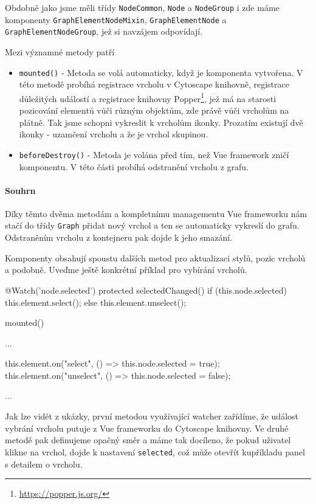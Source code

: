 Obdobně jako jsme měli třídy \texttt{NodeCommon}, \texttt{Node} a \texttt{NodeGroup} i zde máme komponenty \texttt{GraphElementNodeMixin}, \texttt{GraphElementNode} a \\\texttt{GraphElementNodeGroup}, jež si navzájem odpovídají.

Mezi významné metody patří
\begin{itemize}
  \item \texttt{mounted()} - Metoda se volá automaticky, když je komponenta vytvořena. V této metodě probíhá registrace vrcholu v Cytoscape knihovně, registrace důležitých událostí a registrace knihovny Popper\footnote{\url{https://popper.js.org/}}, jež má na starosti pozicování elementů vůči různým objektům, zde právě vůči vrcholům na plátně. Tak jsme schopni vykreslit k vrcholům ikonky. Prozatím existují dvě ikonky - uzamčení vrcholu a že je vrchol skupinou.
  \item \texttt{beforeDestroy()} - Metoda je volána před tím, než Vue framework zničí komponentu. V této části probíhá odstranění vrcholu z grafu.
\end{itemize}

\paragraph{Souhrn} Díky těmto dvěma metodám a kompletnímu managementu Vue frameworku nám stačí do třídy \texttt{Graph} přidat nový vrchol a ten se automaticky vykreslí do grafu. Odstraněním vrcholu z kontejneru pak dojde k jeho smazání.


\newpage
Komponenty obsahují spoustu dalších metod pro aktualizaci stylů, pozic vrcholů a podobně. Uveďme ještě konkrétní příklad pro vybírání vrcholů.
\begin{code}
@Watch('node.selected')
protected selectedChanged() {
    if (this.node.selected) {
        this.element.select();
    } else {
        this.element.unselect();
    }
}

mounted() {
    ...

    this.element.on("select", () => this.node.selected = true);
    this.element.on("unselect", () => this.node.selected = false);

    ...
}
\end{code}

Jak lze vidět z ukázky, první metodou využívající watcher zařídíme, že událost vybrání vrcholu putuje z Vue frameworku do Cytoscape knihovny. Ve druhé metodě pak definujeme opačný směr a máme tak docíleno, že pokud uživatel klikne na vrchol, dojde k nastavení \texttt{selected}, což může otevřít kupříkladu panel s detailem o vrcholu.

